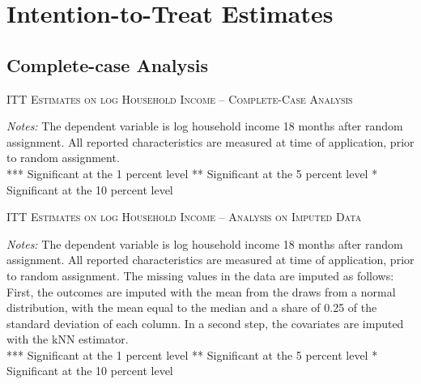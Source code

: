 

\section{Intention-to-Treat Estimates}
\label{sec:itt_estimates}
\subsection{Complete-case Analysis}



\begin{table}[t!]
\centering
\caption{\textsc{ITT Estimates on log Household Income -- Complete-Case Analysis}}



\medskip
\begin{adjustbox}{width=0.825\textwidth, totalheight=\textheight, keepaspectratio}

\end{adjustbox}

\label{tab:table_complete_withcontr}
\bigskip
\raggedright
\footnotesize
\textit{Notes:} The dependent variable is log household income 18 months after random assignment. All reported characteristics are measured at time of application, prior to random assignment. \\
*** Significant at the 1 percent level ** Significant at the 5 percent level * Significant at the 10 percent level
\end{table}

\begin{table}[t!]
\centering
\caption{\textsc{ITT Estimates on log Household Income -- Analysis on Imputed Data}}



\medskip
\begin{adjustbox}{width=0.825\textwidth, totalheight=\textheight, keepaspectratio}

\end{adjustbox}

\label{tab:table_kNN_withcontr}
\bigskip
\raggedright
\footnotesize
\textit{Notes:} The dependent variable is log household income 18 months after random assignment. All reported characteristics are measured at time of application, prior to random assignment. The missing values in the data are imputed as follows: First, the outcomes are imputed with the mean from the draws from a normal distribution, with the mean equal to the median and a share of 0.25 of the standard deviation of each column. In a second step, the covariates are imputed with the \ac{kNN} estimator. \\
*** Significant at the 1 percent level ** Significant at the 5 percent level * Significant at the 10 percent level
\end{table}


